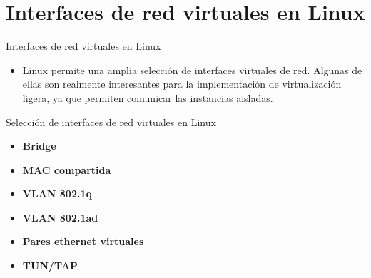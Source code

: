 \documentclass[aspectratio=169,xcolor=dvipsnames]{beamer}
\begin{document}
	
	\section{Interfaces de red virtuales en Linux}
	
	\begin{frame}{Interfaces de red virtuales en Linux}
		\begin{itemize}
		    \item Linux permite una amplia selección de interfaces virtuales de red. Algunas de ellas son realmente interesantes para la implementación de virtualización ligera, ya que permiten comunicar las instancias aisladas.
		\end{itemize}
		
		\begin{alertblock}{Selección de interfaces de red virtuales en Linux}
		    \begin{itemize}
		        \item \textbf{Bridge}
		        \item \textbf{MAC compartida}
		        \item \textbf{VLAN 802.1q}
		        \item \textbf{VLAN 802.1ad}
		        \item \textbf{Pares ethernet virtuales}
		        \item \textbf{TUN/TAP}
		    \end{itemize}
		\end{alertblock}
	\end{frame}
	
\end{document}
